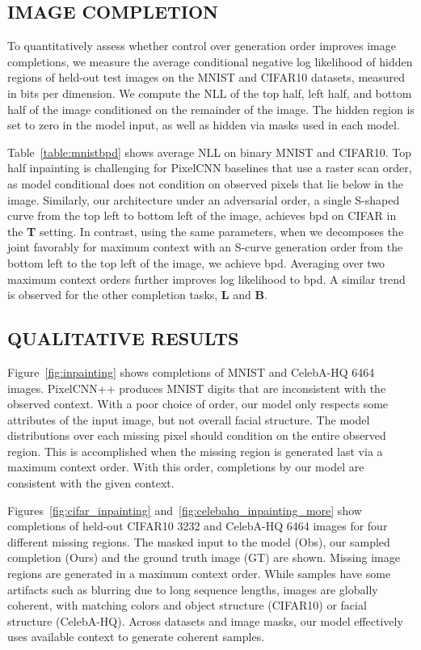 \documentclass[letterpaper]{article}
\begin{document}
\subsection{IMAGE COMPLETION}

To quantitatively assess whether control over generation order improves image completions, we measure the average conditional negative log likelihood of hidden regions of held-out test images on the MNIST and CIFAR10 datasets, measured in bits per dimension. We compute the NLL of the top half, left half, and bottom half of the image conditioned on the remainder of the image. The hidden region is set to zero in the model input, as well as hidden via masks used in each model.

Table~\ref{table:mnistbpd} shows average NLL on binary MNIST and CIFAR10. Top half inpainting is challenging for PixelCNN baselines that use a raster scan order, as model conditional  does not condition on observed pixels that lie below  in the image. Similarly, our architecture under an adversarial order, a single S-shaped curve from the top left to bottom left of the image, achieves  bpd on CIFAR in the \textbf{T} setting. In contrast, using the same parameters, when we decomposes the joint favorably for maximum context with an S-curve generation order from the bottom left to the top left of the image, we achieve  bpd. Averaging over two maximum context orders further improves log likelihood to  bpd. A similar trend is observed for the other completion tasks, \textbf{L} and \textbf{B}.

\subsection{QUALITATIVE RESULTS}

Figure~\ref{fig:inpainting} shows completions of MNIST and CelebA-HQ 6464 images. PixelCNN++ produces MNIST digits that are inconsistent with the observed context. With a poor choice of order, our model only respects some attributes of the input image, but not overall facial structure. The model distributions over each missing pixel should condition on the entire observed region. This is accomplished when the missing region is generated last via a maximum context order. With this order, completions by our model are consistent with the given context.

Figures~\ref{fig:cifar_inpainting} and~\ref{fig:celebahq_inpainting_more} show completions of held-out CIFAR10 3232 and CelebA-HQ 6464 images for four different missing regions.
The masked input to the model (Obs), our sampled completion (Ours) and the ground truth image (GT) are shown. Missing image regions are generated in a maximum context order. While samples have some artifacts such as blurring due to long sequence lengths, images are globally coherent, with matching colors and object structure (CIFAR10) or facial structure (CelebA-HQ). Across datasets and image masks, our model effectively uses available context to generate coherent samples.
\end{document}
